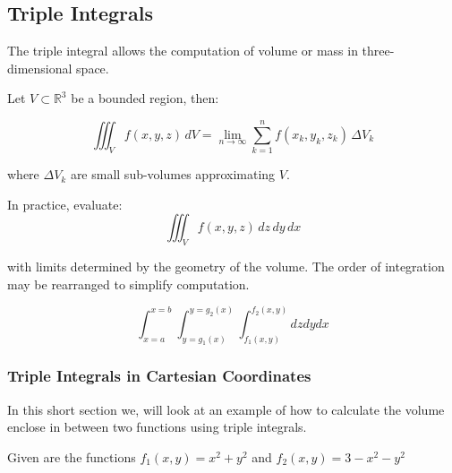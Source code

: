 \QED

\subsection{Triple Integrals}

The triple integral allows the computation of volume or mass in three-dimensional space.

Let \( V \subset \mathbb{R}^3 \) be a bounded region, then:

\[
\iiint_V f(x, y, z)\, dV = \lim_{n \to \infty} \sum_{k=1}^n f(x_k, y_k, z_k) \, \Delta V_k
\]

where \( \Delta V_k \) are small sub-volumes approximating \( V \).

In practice, evaluate:
\[
\iiint_V f(x, y, z)\, dz\, dy\, dx
\]

with limits determined by the geometry of the volume. The order of integration may be rearranged to simplify computation.

\[
\int_{x=a}^{x=b}\int_{y=g_1(x)}^{y=g_2(x)} \int_{f_1(x,y)}^{f_2(x,y)} dz dy dx
\]

\subsubsection{Triple Integrals in Cartesian Coordinates}

In this short section we, will look at an example of how to calculate the volume enclose in
between two functions using triple integrals.

Given are the functions \(f_1(x,y) = x^2 + y^2\) and \(f_2(x,y) = 3 - x^2 - y^2\)


\begin{center}
    
\end{center}

